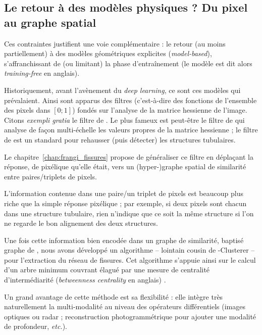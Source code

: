\subsection{Le retour à des modèles physiques ? Du pixel au graphe spatial}

Ces contraintes justifient une voie complémentaire : le retour (au moins partiellement) à des modèles géométriques explicites (\emph{model-based}), s'affranchissant de (ou limitant) la phase d'entraînement (le modèle est dit alors \emph{training-free} en anglais). 

Historiquement, avant l'avènement du \emph{deep learning}, ce sont ces modèles qui prévalaient.
Ainsi sont apparus des filtres (c'est-à-dire des fonctions de l'ensemble des pixels dans $[ 0 ; 1]$) fondés sur l'analyse de la matrice hessienne de l'image.
Citons \emph{exempli gratia} le filtre de  \cite{Sato1998}. Le plus fameux est peut-être le filtre de  \cite{Frangi1998} qui analyse de façon multi-échelle les valeurs propres de la matrice hessienne ; le filtre de  est un standard pour rehausser (puis détecter) les structures tubulaires. 

Le chapitre~\ref{chap:frangi_fissures} propose de généraliser ce filtre en déplaçant la réponse, de pixélique qu'elle était, vers un (hyper-)graphe spatial de similarité entre paires/triplets de pixels. 

L'information contenue dans une paire/un triplet de pixels est beaucoup plus riche que la simple réponse pixélique ; par exemple, si deux pixels sont chacun dans une structure tubulaire, rien n'indique que ce soit la même structure si l'on ne regarde le bon alignement des deux structures.

Une fois cette information bien encodée dans un graphe de similarité, baptisé graphe de , nous avons développé un algorithme -- lointain cousin de \HGP-Clusterer -- pour l'extraction du réseau de fissures. 
Cet algorithme s'appuie ainsi sur le calcul d'un arbre minimum couvrant élagué par une mesure de centralité d'intermédiarité (\emph{betweenness centrality} en anglais) \cite{Freeman1977, AvrachenkovDreveton2022}. 

Un grand avantage de cette méthode est sa flexibilité : elle intègre très naturellement la multi-modalité au niveau des opérateurs différentiels (images optiques ou radar ; reconstruction  photogrammétrique pour ajouter une modalité de profondeur, \emph{etc.}).


